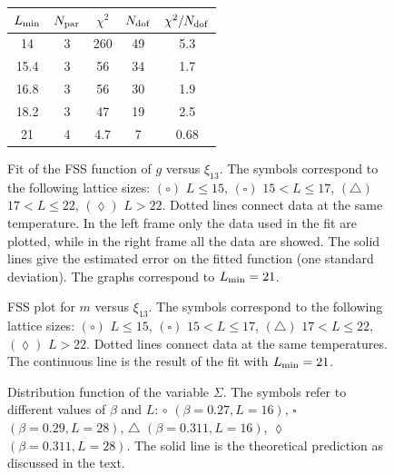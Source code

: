 \documentclass[12pt]{article}
\newcommand{\text}{\rm}
\begin{document}
\begin{figure}
\begin{center}
{\scriptsize
\begin{tabular}{|c|c|c|c|c|}
\hline
$L_{\text{min}}$ & $N_{\text{par}}$ & $\chi^2$ & $N_{\text{dof}}$ &
$\chi^2/N_{\text{dof}}$ \\
\hline
 14  &       3    &    260 &  49  &    5.3\\
 15.4  &       3    &    56 &  34  &    1.7\\
 16.8  &       3    &    56 &  30  &    1.9\\
 18.2  &       3    &    47 &  19  &    2.5\\
 21  &       4    &    4.7 &  7   &    0.68\\
 \hline
\end{tabular}
}
\end{center}
\caption{ Fit of the FSS function of $g$ versus $\xi_{13}$.
The symbols correspond to the
following lattice sizes: $(\circ)$ $ L\le 15$, $( \square )$ $ 15 < L \le 17$,
$(\triangle)$ $ 17 < L \le 22$, $(\lozenge)$ $ L > 22$.
Dotted lines connect data at the same temperature.
In the left frame only the data used in the fit are plotted,
while in the right frame all the data are showed.
The solid lines give the estimated error on
the fitted function (one standard deviation).
The graphs correspond to  $L_{\text{min}}=21$.}
\label{fig:fitfss_g_xi13} 
\end{figure}

\begin{figure}
\caption{FSS plot for $m$ versus $\xi_{13}$.
The symbols correspond to the
following lattice sizes: $(\circ)$ $ L\le 15$, $( \square )$ $ 15 < L \le 17$,
$(\triangle)$ $ 17 < L \le 22$, $(\lozenge)$ $ L > 22$.
Dotted lines connect data at the same temperatures.
The continuous line is the result of the fit with $L_{\rm min} = 21$.
}
\label{fig:fssplot_m_xi13}
\end{figure}

\begin{figure}
\begin{center}
\end{center}
\caption{Distribution function of the variable $\Sigma$. 
  The symbols refer to different 
  values of $\beta$ and $L$: $\circ$ $(\beta=0.27,L=16)$,
  $\square$ $(\beta=0.29,L=28)$, $\triangle$ $(\beta=0.311,L=16)$, $\lozenge$
  $(\beta=0.311,L=28)$. The solid line is the theoretical prediction as
  discussed in the text. }
\label{Mag-distribution}
\end{figure}
 
\end{document}
